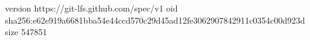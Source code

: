 version https://git-lfs.github.com/spec/v1
oid sha256:e62e919a6681bba54e44ccd570c29d45ad12fe3062907842911c0354c00d923d
size 547851

